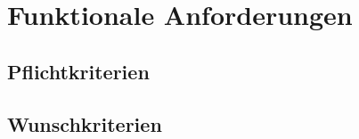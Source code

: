 \section{Funktionale Anforderungen}

\subsection{Pflichtkriterien}

\subsubsection{}

\subsection{Wunschkriterien}
